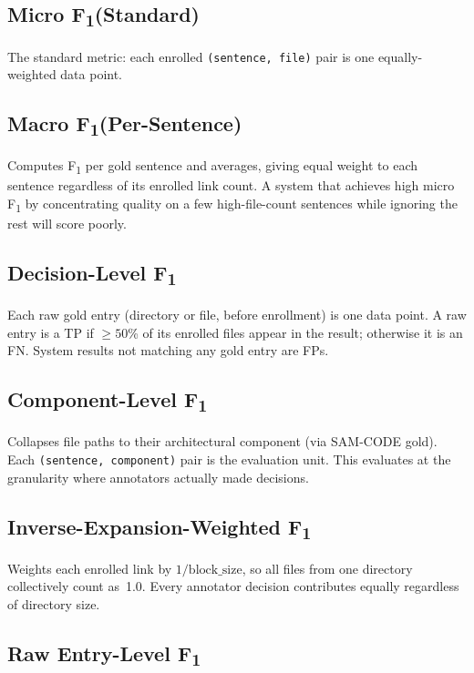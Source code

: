\documentclass[11pt,a4paper]{report}
\newcommand{\samcode}{SAM-CODE\xspace}
\newcommand{\fone}{F\textsubscript{1}\xspace}
\begin{document}
\label{sec:eval:f1}

\subsection{Micro \fone (Standard)}

The standard metric: each enrolled \texttt{(sentence, file)} pair is one
equally-weighted data point.

\subsection{Macro \fone (Per-Sentence)}

Computes \fone per gold sentence and averages, giving equal weight to each
sentence regardless of its enrolled link count. A system that achieves high
micro \fone by concentrating quality on a few high-file-count sentences while
ignoring the rest will score poorly.

\subsection{Decision-Level \fone}

Each raw gold entry (directory or file, before enrollment) is one data point. A
raw entry is a TP if ${\geq}50$\% of its enrolled files appear in the result;
otherwise it is an FN. System results not matching any gold entry are FPs.

\subsection{Component-Level \fone}

Collapses file paths to their architectural component (via \samcode gold).
Each \texttt{(sentence, component)} pair is the evaluation unit. This evaluates
at the granularity where annotators actually made decisions.

\subsection{Inverse-Expansion-Weighted \fone}

Weights each enrolled link by $1/\text{block\_size}$, so all files from one
directory collectively count as~1.0. Every annotator decision contributes
equally regardless of directory size.

\subsection{Raw Entry-Level \fone}
\end{document}
